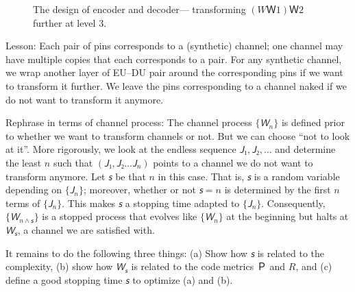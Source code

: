 \documentclass[openany]{amsbook}
\numberwithin{equation}{chapter}
\numberwithin{figure}{chapter}
\numberwithin{table}{chapter}
\theoremstyle{definition}	理dfn:Definition~?s			理exa:Example~?s
\theoremstyle{remark}		理cla:Claim~?s				理rem:Remark~?s
\begin{document}
	\begin{figure}
		\caption{
			The design of encoder and decoder---%
			transforming $(WＷ1)Ｗ2$ further at level $3$.
		}\label{fig:transform(1)(2)}
	\end{figure}
	
	Lesson:
	Each pair of pins corresponds to a (synthetic) channel;
	one channel may have multiple copies that each corresponds to a pair.
	For any synthetic channel, we wrap another layer of EU--DU pair
	around the corresponding pins if we want to transform it further.
	We leave the pins corresponding to a channel naked
	if we do not want to transform it anymore.
	
	Rephrase in terms of channel process:
	The channel process $\{𝘞_n\}$ is defined prior to
	whether we want to transform channels or not.
	But we can choose “not to look at it”.
	More rigorously, we look at the endless sequence $𝘑₁,𝘑₂,\dotsc$
	and determine the least $n$ such that $(𝘑₁,𝘑₂…𝘑_n)$
	points to a channel we do not want to transform anymore.
	Let $𝘴$ be that $n$ in this case.
	That is, $𝘴$ is a random variable depending on $\{𝘑_n\}$;
	moreover, whether or not $𝘴=n$ is determined by the first $n$ terms of $\{𝘑_n\}$.
	This makes $𝘴$ a stopping time adapted to $\{𝘑_n\}$.
	Consequently, $\{𝘞_{n∧𝘴}\}$ is a stopped process that evolves like $\{𝘞_n\}$
	at the beginning but halts at $𝘞_𝘴$, a channel we are satisfied with.
	
	It remains to do the following three things:
	(a)	Show how $𝘴$ is related to the complexity,
	(b)	show how $𝘞_𝘴$ is related to the code metrics $Ｐ$ and $R$, and
	(c)	define a good stopping time $𝘴$ to optimize (a) and (b).
\end{document}
